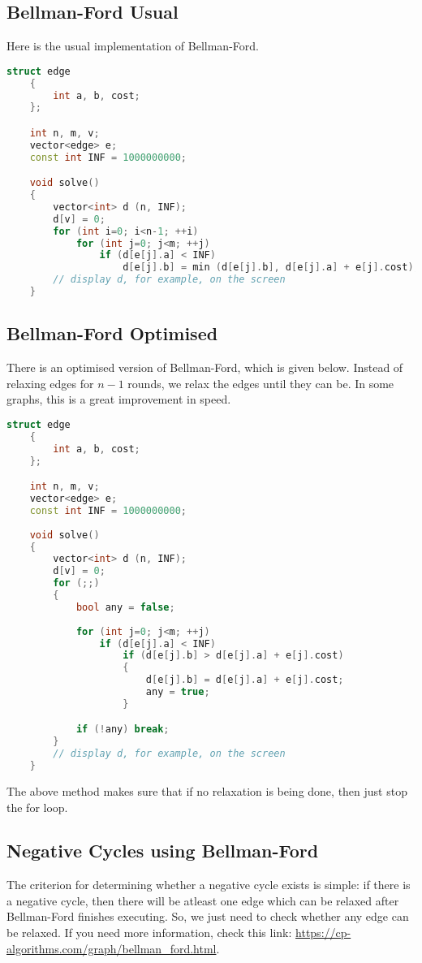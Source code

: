 \documentclass[12pt,a4paper]{amsart}
\numberwithin{equation}{section}
\theoremstyle{definition}
\begin{document}
\subsection{Bellman-Ford Usual} Here is the usual implementation of Bellman-Ford. 

\begin{lstlisting}[language=C++]
    struct edge
    {
        int a, b, cost;
    };

    int n, m, v;
    vector<edge> e;
    const int INF = 1000000000;

    void solve()
    {
        vector<int> d (n, INF);
        d[v] = 0;
        for (int i=0; i<n-1; ++i)
            for (int j=0; j<m; ++j)
                if (d[e[j].a] < INF)
                    d[e[j].b] = min (d[e[j].b], d[e[j].a] + e[j].cost);
        // display d, for example, on the screen
    }
\end{lstlisting}

\subsection{Bellman-Ford Optimised} There is an optimised version of Bellman-Ford, which is given below. Instead of relaxing edges for $n - 1$ rounds, we relax the edges until they can be. In some graphs, this is a great improvement in speed. 

\begin{lstlisting}[language=C++]
    struct edge
    {
        int a, b, cost;
    };

    int n, m, v;
    vector<edge> e;
    const int INF = 1000000000;
    
    void solve()
    {
        vector<int> d (n, INF);
        d[v] = 0;
        for (;;)
        {
            bool any = false;
    
            for (int j=0; j<m; ++j)
                if (d[e[j].a] < INF)
                    if (d[e[j].b] > d[e[j].a] + e[j].cost)
                    {
                        d[e[j].b] = d[e[j].a] + e[j].cost;
                        any = true;
                    }

            if (!any) break;
        }
        // display d, for example, on the screen
    }
\end{lstlisting}
The above method makes sure that if no relaxation is being done, then just stop the for loop. 

\subsection{Negative Cycles using Bellman-Ford} The criterion for determining whether a negative cycle exists is simple: if there is a negative cycle, then there will be atleast one edge which can be relaxed after Bellman-Ford finishes executing. So, we just need to check whether any edge can be relaxed. If you need more information, check this link: \url{https://cp-algorithms.com/graph/bellman_ford.html}. 
\end{document}
